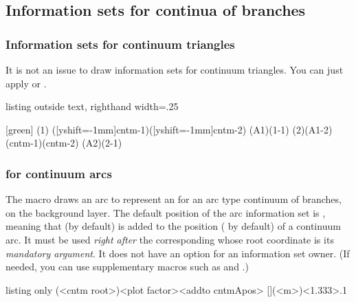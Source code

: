 \subsection{Information sets for continua of branches}

\subsubsection{Information sets for continuum triangles}

It is not an issue to draw information sets for continuum triangles. You can just apply \cmd{\xtInfoset} or \cmd{\xtInfosetO}.

\begin{tcblisting}{listing outside text, righthand width=.25\linewidth}
\begin{istgame}
\cntmdistance*{8mm}
[green]
\istrootcntm(1)           \istb  \endist
\xtInfoset([yshift=-1mm]cntm-1)([yshift=-1mm]cntm-2)
\istroot(A1)(1-1)  \istb  \istb  \endist
\istrootcntm(2)(A1-2)     \istb  \endist
\xtInfosetO[fill=red,opacity=.4](cntm-1)(cntm-2)
\istroot(A2)(2-1)  \istb  \istb  \endist
\end{istgame}
\end{tcblisting}


\subsubsection{\protect\cmd{\cntmAInfoset} for continuum arcs}

The macro \icmd{\cntmAInfoset} draws an arc to represent an  for an arc type continuum of branches,
on the background layer.
The default position of the arc information set is , meaning that  (by default) is added to the position ( by default) of a continuum arc.
It must be used \emph{right after} the corresponding \cmd{\istrootcntmA} whose root coordinate is its \emph{mandatory argument}. It does not have an option for an information set owner. (If needed, you can use supplementary macros such as \cmd{\xtInfosetOwner} and \cmd{\xtOwner}.)

\begin{tcblisting}{listing only}
  (<cntm root>)<plot factor>{<addto cntmApos>}
  [](<m>)<1.333>{.1}
\end{tcblisting}

